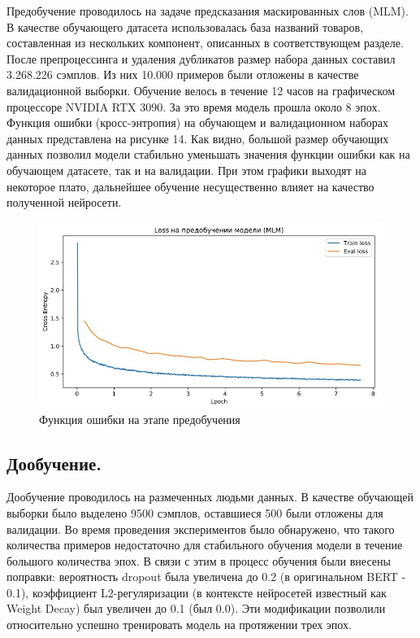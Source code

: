 \documentclass[12pt,a4paper]{article}
\begin{document}
Предобучение проводилось на задаче предсказания маскированных слов (MLM). В качестве обучающего датасета использовалась база названий товаров, составленная из нескольких компонент, описанных в соответствующем разделе. После препроцессинга и удаления дубликатов размер набора данных составил 3.268.226 сэмплов. Из них 10.000 примеров были отложены в качестве валидационной выборки. Обучение велось в течение 12 часов на графическом процессоре NVIDIA RTX 3090. За это время модель прошла около 8 эпох. Функция ошибки (кросс-энтропия) на обучающем и валидационном наборах данных представлена на рисунке 14. Как видно, большой размер обучающих данных позволил модели стабильно уменьшать значения функции ошибки как на обучающем датасете, так и на валидации. При этом графики выходят на некоторое плато, дальнейшее обучение несущественно влияет на качество полученной нейросети.

\begin{figure}[H]
	\begin{center}
		\includegraphics[scale=0.4]{loss_pretrain.jpg}
	\end{center}
	\caption{Функция ошибки на этапе предобучения}
\end{figure}

\noindent 

\subsection{Дообучение.}

Дообучение проводилось на размеченных людьми данных. В качестве обучающей выборки было выделено 9500 сэмплов, оставшиеся 500 были отложены для валидации. Во время проведения экспериментов было обнаружено, что такого количества примеров недостаточно для стабильного обучения модели в течение большого количества эпох. В связи с этим в процесс обучения были внесены поправки: вероятность dropout была увеличена до 0.2 (в оригинальном BERT - 0.1), коэффициент L2-регуляризации (в контексте нейросетей известный как Weight Decay) был увеличен до 0.1 (был 0.0). Эти модификации позволили относительно успешно тренировать модель на протяжении трех эпох.
\end{document}
